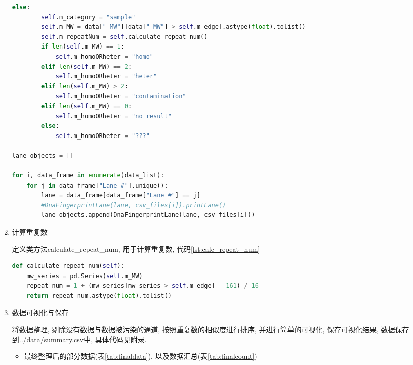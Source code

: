 \documentclass[AutoFakeBold]{LZUThesis}
\begin{document}
\begin{enumerate}
\begin{lstlisting}[language=python, caption={封装并清洗数据}, label={lst:cleandata}, style=myPythonStyle]
    else:
        self.m_category = "sample"
        self.m_MW = data[" MW"][data[" MW"] > self.m_edge].astype(float).tolist()
        self.m_repeatNum = self.calculate_repeat_num()
        if len(self.m_MW) == 1:
            self.m_homoORheter = "homo"
        elif len(self.m_MW) == 2:
            self.m_homoORheter = "heter"
        elif len(self.m_MW) > 2:
            self.m_homoORheter = "contamination"
        elif len(self.m_MW) == 0:
            self.m_homoORheter = "no result"
        else:
            self.m_homoORheter = "???"
    
lane_objects = []

for i, data_frame in enumerate(data_list):
    for j in data_frame["Lane #"].unique():
        lane = data_frame[data_frame["Lane #"] == j]
        #DnaFingerprintLane(lane, csv_files[i]).printLane()
        lane_objects.append(DnaFingerprintLane(lane, csv_files[i]))
    \end{lstlisting}

    \item 计算重复数\par
    定义类方法calculate\_repeat\_num, 用于计算重复数, 代码\ref{lst:calc_repeat_num}

    \begin{lstlisting}[language=python, caption={计算重复数}, label={lst:calc_repeat_num}, style=myPythonStyle]    
def calculate_repeat_num(self):
    mw_series = pd.Series(self.m_MW)
    repeat_num = 1 + (mw_series[mw_series > self.m_edge] - 161) / 16
    return repeat_num.astype(float).tolist()
    \end{lstlisting}
    
    \item 数据可视化与保存\par
    将数据整理, 剔除没有数据与数据被污染的通道, 按照重复数的相似度进行排序, 并进行简单的可视化, 保存可视化结果, 数据保存到../data/summary.csv中, 具体代码见附录.

    \begin{itemize}
        \item 最终整理后的部分数据(表\ref{tab:finaldata}), 以及数据汇总(表\ref{tab:finalcount})


\end{itemize}
\end{enumerate}
\end{document}
